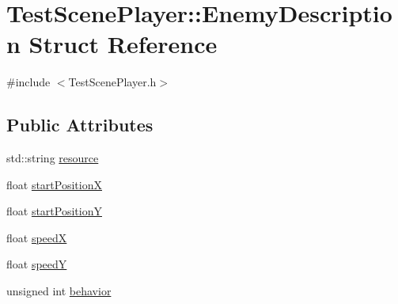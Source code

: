 \hypertarget{struct_test_scene_player_1_1_enemy_description}{
\section{TestScenePlayer::EnemyDescription Struct Reference}
\label{d5/d29/struct_test_scene_player_1_1_enemy_description}
}


{\ttfamily \#include $<$TestScenePlayer.h$>$}

\subsection*{Public Attributes}
\begin{DoxyCompactItemize}
\item 
std::string \hyperlink{struct_test_scene_player_1_1_enemy_description_a6e3fde335eb4b075b76f89a346750672}{resource}
\item 
float \hyperlink{struct_test_scene_player_1_1_enemy_description_a3f9174796f2c8b371db3d49cbac3265a}{startPositionX}
\item 
float \hyperlink{struct_test_scene_player_1_1_enemy_description_a95f79275bb4217d0eb02d62fc9476b52}{startPositionY}
\item 
float \hyperlink{struct_test_scene_player_1_1_enemy_description_ad64d61ce1d12f2682d25c165396799e4}{speedX}
\item 
float \hyperlink{struct_test_scene_player_1_1_enemy_description_ae6c3245759b23c3dacf4188c233ef57c}{speedY}
\item 
unsigned int \hyperlink{struct_test_scene_player_1_1_enemy_description_a10d3b47395f41d22dac6cba49dc6db1a}{behavior}
\end{DoxyCompactItemize}


